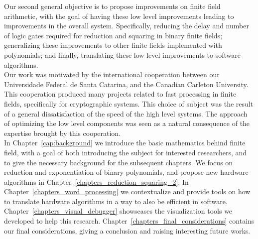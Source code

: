 Our second general objective is to propose improvements on finite field arithmetic, with the goal of having these low level improvements leading to improvements in the overall system. Specifically, reducing the delay and number of logic gates required for reduction and squaring in binary finite fields; generalizing these improvements to other finite fields implemented with polynomials; and finally, translating these low level improvements to software algorithms. \\

Our work was motivated by the international cooperation between our Universidade Federal de Santa Catarina, and the Canadian Carleton University. This cooperation produced many projects related to fast processing in finite fields, specifically for cryptographic systems. This choice of subject was the result of a general dissatisfaction of the speed of the high level systems. The approach of optimizing the low level components was seen as a natural consequence of the expertise brought by this cooperation. \\

In Chapter~\ref{cap:background} we introduce the basic mathematics behind finite field, with a goal of both introducing the subject for interested researchers, and to give the necessary background for the subsequent chapters. We focus on reduction and exponentiation of binary polynomials, and propose new hardware algorithms in Chapter~\ref{chapters_reduction_squaring_2}. In Chapter~\ref{chapters_word_processing} we contextualize and provide tools on how to translate hardware algorithms in a way to also be efficient in software. Chapter~\ref{chapters_visual_debugger} showscases the visualization tools we developed to help this research. Chapter~\ref{chapters_final_considerations} contains our final considerations, giving a conclusion and raising interesting future works. \\


%
%
%
%
